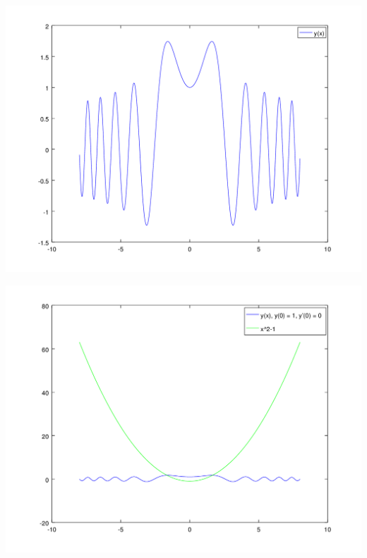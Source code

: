 \begin{refsection}
\includegraphics[scale=0.6]{./wellen/octave/images/a01a10/wave.png}

\includegraphics[scale=0.6]{./wellen/octave/images/a01a10/wavewithparabola.png}

\printbibliography[heading=subbibliography]
\end{refsection}